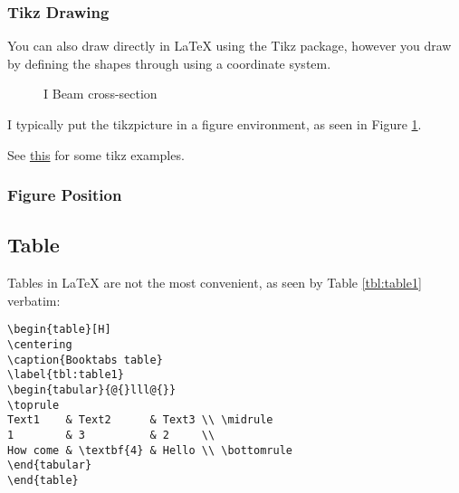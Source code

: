 \documentclass[11pt,a4paper,titlepage]{article}
\begin{document}
\subsubsection{Tikz Drawing}
You can also draw directly in \LaTeX{} using the Tikz package, however you draw by defining the shapes through using a coordinate system.


\begin{figure}[h]
\centering

\caption{I Beam cross-section}
\label{fig:I_beam}
\end{figure}


I typically put the tikzpicture in a figure environment, as seen in Figure \ref{fig:I_beam}.

See \href{http://texample.net/tikz/}{this} for some tikz examples.
\subsubsection{Figure Position}


\subsection{Table}




Tables in \LaTeX{} %
are not the most convenient, as seen by Table \ref{tbl:table1} verbatim:

\begin{verbatim}
\begin{table}[H]
\centering
\caption{Booktabs table}
\label{tbl:table1}
\begin{tabular}{@{}lll@{}}
\toprule
Text1    & Text2      & Text3 \\ \midrule
1        & 3          & 2     \\
How come & \textbf{4} & Hello \\ \bottomrule
\end{tabular}
\end{table}
\end{verbatim}
\end{document}
